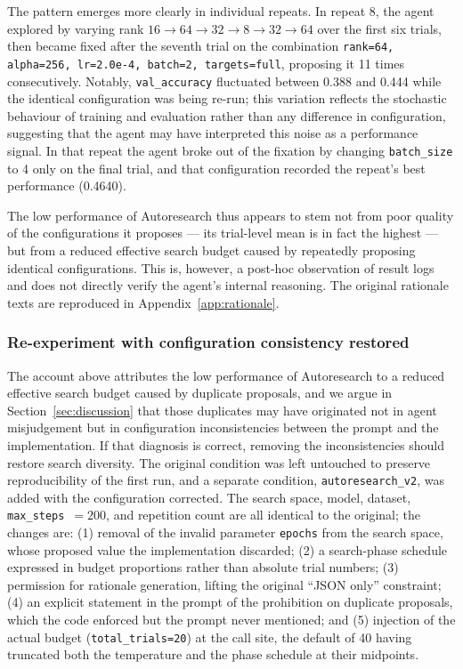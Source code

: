 The pattern emerges more clearly in individual repeats. In repeat 8, the agent
explored by varying rank $16 \rightarrow 64 \rightarrow 32 \rightarrow 8
\rightarrow 32 \rightarrow 64$ over the first six trials, then became fixed after
the seventh trial on the combination \texttt{rank=64, alpha=256, lr=2.0e-4,
batch=2, targets=full}, proposing it 11 times consecutively. Notably,
\texttt{val\_accuracy} fluctuated between 0.388 and 0.444 while the identical
configuration was being re-run; this variation reflects the stochastic behaviour
of training and evaluation rather than any difference in configuration,
suggesting that the agent may have interpreted this noise as a performance
signal. In that repeat the agent broke out of the fixation by changing
\texttt{batch\_size} to 4 only on the final trial, and that configuration
recorded the repeat's best performance (0.4640).

The low performance of Autoresearch thus appears to stem not from poor quality of
the configurations it proposes --- its trial-level mean is in fact the highest ---
but from a reduced effective search budget caused by repeatedly proposing
identical configurations. This is, however, a post-hoc observation of result logs
and does not directly verify the agent's internal reasoning. The original
rationale texts are reproduced in Appendix~\ref{app:rationale}.

\subsubsection{Re-experiment with configuration consistency restored}
\label{sec:res-v2}

The account above attributes the low performance of Autoresearch to a reduced
effective search budget caused by duplicate proposals, and we argue in
Section~\ref{sec:discussion} that those duplicates may have originated not in
agent misjudgement but in configuration inconsistencies between the prompt and
the implementation. If that diagnosis is correct, removing the inconsistencies
should restore search diversity. The original condition was left untouched to
preserve reproducibility of the first run, and a separate condition,
\texttt{autoresearch\_v2}, was added with the configuration corrected. The search
space, model, dataset, \texttt{max\_steps}~$=200$, and repetition count are all
identical to the original; the changes are: (1) removal of the invalid parameter
\texttt{epochs} from the search space, whose proposed value the implementation
discarded; (2) a search-phase schedule expressed in budget proportions rather
than absolute trial numbers; (3) permission for rationale generation, lifting the
original ``JSON only'' constraint; (4) an explicit statement in the prompt of the
prohibition on duplicate proposals, which the code enforced but the prompt never
mentioned; and (5) injection of the actual budget (\texttt{total\_trials=20}) at
the call site, the default of 40 having truncated both the temperature and the
phase schedule at their midpoints.

